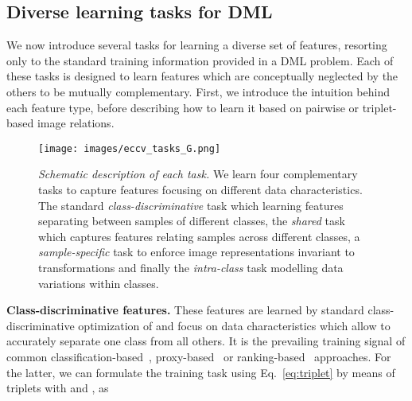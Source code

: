 \documentclass[runningheads]{llncs}
\begin{document}
\subsection{Diverse learning tasks for DML}
\label{sec:feature_tasks}
We now introduce several tasks for learning a diverse set of features, resorting only to the standard training information provided in a DML problem. Each of these tasks is designed to learn features which are conceptually neglected by the others to be mutually complementary. 
First, we introduce the intuition behind each feature type, before describing how to learn it based on pairwise or triplet-based image relations. 
\\
\begin{figure}[t]
    \centering
    \texttt{[image: images/eccv\_tasks\_G.png]}
    \caption{\textit{Schematic description of each task.} We learn four complementary tasks to capture features focusing on different data characteristics. The standard \textit{class-discriminative} task which learning features separating between samples of different classes, the \textit{shared} task which captures features relating samples across different classes, a \textit{sample-specific} task to enforce image representations invariant to transformations and finally the \textit{intra-class} task modelling data variations within classes.}
    \label{fig:tasks}
\end{figure} 
\noindent
\textbf{Class-discriminative features.} These features are learned by standard class-discriminative optimization of  and focus on data characteristics which allow to accurately separate one class from all others. It is the prevailing training signal of common classification-based~\cite{angular,arcface,zhai2018classification}, proxy-based~\cite{proxynca,softriple} or ranking-based~\cite{mic,abier} approaches. For the latter, we can formulate the training task using Eq.~\ref{eq:triplet} by means of triplets  with  and , as 
\end{document}
